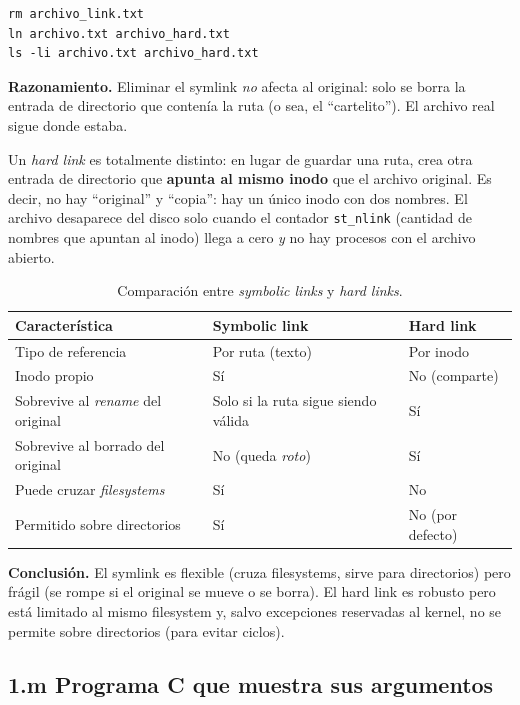 \documentclass[11pt,a4paper]{article}
\begin{document}
\begin{lstlisting}
rm archivo_link.txt
ln archivo.txt archivo_hard.txt
ls -li archivo.txt archivo_hard.txt
\end{lstlisting}

\textbf{Razonamiento.} Eliminar el symlink \emph{no} afecta al
original: solo se borra la entrada de directorio que contenía la ruta
(o sea, el ``cartelito''). El archivo real sigue donde estaba.

Un \emph{hard link} es totalmente distinto: en lugar de guardar una
ruta, crea otra entrada de directorio que \textbf{apunta al mismo
inodo} que el archivo original. Es decir, no hay ``original'' y
``copia'': hay un único inodo con dos nombres. El archivo desaparece
del disco solo cuando el contador \texttt{st\_nlink} (cantidad de
nombres que apuntan al inodo) llega a cero \emph{y} no hay procesos
con el archivo abierto.

\begin{table}[h]
\centering
\small
\begin{tabular}{p{4.5cm} p{4.8cm} p{4.8cm}}
\toprule
\textbf{Característica} & \textbf{Symbolic link} & \textbf{Hard link} \\
\midrule
Tipo de referencia & Por ruta (texto) & Por inodo \\
Inodo propio & Sí & No (comparte) \\
Sobrevive al \emph{rename} del original & Solo si la ruta sigue siendo válida & Sí \\
Sobrevive al borrado del original & No (queda \emph{roto}) & Sí \\
Puede cruzar \emph{filesystems} & Sí & No \\
Permitido sobre directorios & Sí & No (por defecto) \\
\bottomrule
\end{tabular}
\caption{Comparación entre \emph{symbolic links} y \emph{hard links}.}
\end{table}

\textbf{Conclusión.} El symlink es flexible (cruza filesystems, sirve
para directorios) pero frágil (se rompe si el original se mueve o se
borra). El hard link es robusto pero está limitado al mismo filesystem
y, salvo excepciones reservadas al kernel, no se permite sobre
directorios (para evitar ciclos).

\subsection*{1.m Programa C que muestra sus argumentos}
\end{document}
